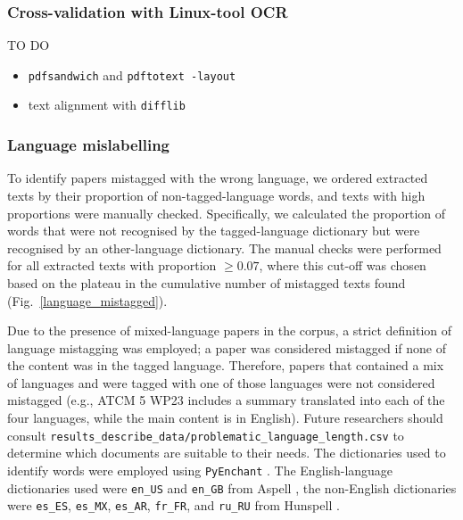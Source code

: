 \documentclass[12pt]{article}
\newcommand{\m}[0]{\color{maroon}}
\begin{document}
\newpage
\subsubsection{Cross-validation with Linux-tool OCR}

{\m TO DO}

\begin{itemize}
    \item {\tt pdfsandwich} \citep{pdfsandwich} 
    and {\tt pdftotext -layout} \citep{pdftotext}
    \item text alignment with {\tt difflib}
\end{itemize}

\clearpage
\subsubsection{Language mislabelling}

To identify papers mistagged with the wrong language,
we ordered extracted texts by their proportion of 
non-tagged-language words,
and texts with high proportions were manually checked.
Specifically, we calculated the proportion of 
words that were not recognised by the tagged-language dictionary 
but were recognised by an other-language dictionary.
The manual checks were performed for all extracted texts with
proportion $\geq 0.07$,
where this cut-off was chosen based
on the plateau in the cumulative number of 
mistagged texts found (Fig.~\ref{language_mistagged}).

Due to the presence of mixed-language papers in the corpus,
a strict definition of language mistagging was employed;
a paper was considered mistagged if none of the content was 
in the tagged language.
Therefore, papers that contained a mix of languages 
and were tagged with one of those languages were not considered mistagged
(e.g., ATCM 5 WP23 includes a summary translated into each of the four languages,
while the main content is in English).
Future researchers should consult
{\tt results\_describe\_data/problematic\_language\_length.csv}
to determine which documents are suitable to their needs.
The dictionaries used to identify words were employed using {\tt PyEnchant} 
\citep{pyenchant, enchant}.
The English-language dictionaries used were 
{\tt en\_US} and {\tt en\_GB} from Aspell \citep{aspell},
the non-English dictionaries were
{\tt es\_ES}, {\tt es\_MX}, {\tt es\_AR}, {\tt fr\_FR}, and {\tt ru\_RU}
from Hunspell \citep{hunspell}.
\end{document}
